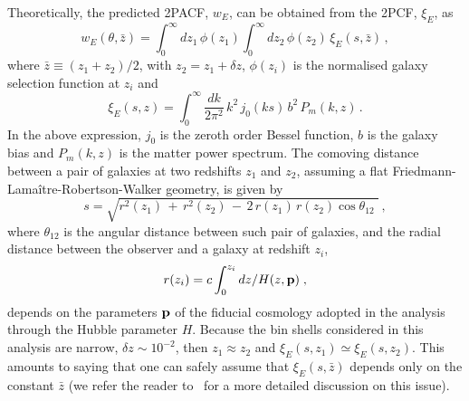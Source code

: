 \documentclass[a4paper,11pt]{article}
\begin{document}
Theoretically, the predicted 2PACF, $w_{E}$, can be obtained from the 2PCF, $\xi_{E}$, as 
%
\begin{equation} \label{expected}
w_{E}(\theta, \bar{z}) = \int_0^\infty dz_1 \,\phi(z_1) \int_0^\infty dz_2 \,\phi(z_2) \,\xi_{E}(s, \bar{z}) \, , 
\end{equation}
where $\bar{z} \equiv (z_1 + z_2) / 2$, with $z_2 = z_1 + \delta z$,   $\phi(z_i)$ is the normalised galaxy selection function at $z_i$ and 
\begin{equation}
\xi_{E}(s,z)=\! \int_0^\infty \! \frac{dk}{2\pi^2} \, k^2 \, j_0(k s) \, b^2 \, P_m(k, z) \, .
\label{xi_e}
\end{equation}
%
In the above expression, $j_0$ is the zeroth order Bessel function, $b$ is the galaxy bias and $P_m(k, z)$ is the matter power spectrum. The comoving distance between a pair of galaxies at two redshifts $z_1$ and $z_2$, assuming a flat Friedmann-Lama\^itre-Robertson-Walker geometry, is given by 
\begin{equation}
s = \sqrt{r^2(z_1) \,+\, r^2(z_2) \,-\, 2 \,r(z_1) \,r(z_2)  \cos \theta_{12} \,\,} \, ,
\end{equation}
where $\theta_{12}$ is the angular distance between such pair of galaxies, and the radial distance between the observer and a galaxy at redshift $z_i$, 
\begin{equation} \label{rz}
r(z_i) = c\int_{0}^{z_i}{dz/H(z, \bf{p})}\;, 
\end{equation}
depends on the  parameters ${\bf{p}}$  of the fiducial cosmology adopted in the analysis through the Hubble parameter $H$. Because the bin shells considered in this analysis are narrow, $\delta z \sim 10^{-2}$, then $z_1 \approx z_2$ and $\xi_{E}(s, z_1) \simeq \xi_{E}(s, z_2)$. This amounts to saying that one can safely assume that $\xi_{E}(s, \bar{z})$ depends only on the constant $\bar{z}$ (we refer the reader to~\cite{Carvalho} for a more detailed discussion on this issue).
\end{document}
